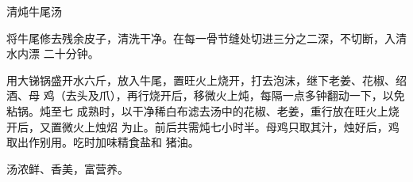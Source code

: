 \begin{recipe}{清炖牛尾汤}

\ingredients



\cooking

将牛尾修去残余皮子，清洗干净。在每一骨节缝处切进三分之二深，不切断，入清水内漂
二十分钟。

用大锑锅盛开水六斤，放入牛尾，置旺火上烧开，打去泡沫，继下老姜、花椒、绍酒、母
鸡（去头及爪），再行烧开后，移微火上炖，每隔一点多钟翻动一下，以免粘锅。炖至七
成熟时，以干净稀白布滤去汤中的花椒、老姜，重行放在旺火上烧开后，又置微火上烛炤
为止。前后共需炖七小时半。母鸡只取其汁，烛好后，鸡取出作别用。吃时加味精食盐和
猪油。

\features

汤浓鲜、香美，富营养。

\end{recipe}

